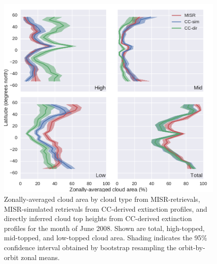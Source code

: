 \begin{figure}[htbp]
\centering
\includegraphics{graphics/misr_cldmisr_zonal_2008-06.pdf}
\caption{\label{fig:misr_cldmisr_zonal_jun}Zonally-averaged cloud area
by cloud type from MISR-retrievals, MISR-simulated retrievals from
CC-derived extinction profiles, and directly inferred cloud top heights
from CC-derived extinction profiles for the month of June 2008. Shown
are total, high-topped, mid-topped, and low-topped cloud area. Shading
indicates the 95\% confidence interval obtained by bootstrap resampling
the orbit-by-orbit zonal
means.}\label{fig:misrux5fcldmisrux5fzonalux5fjun}
\end{figure}

